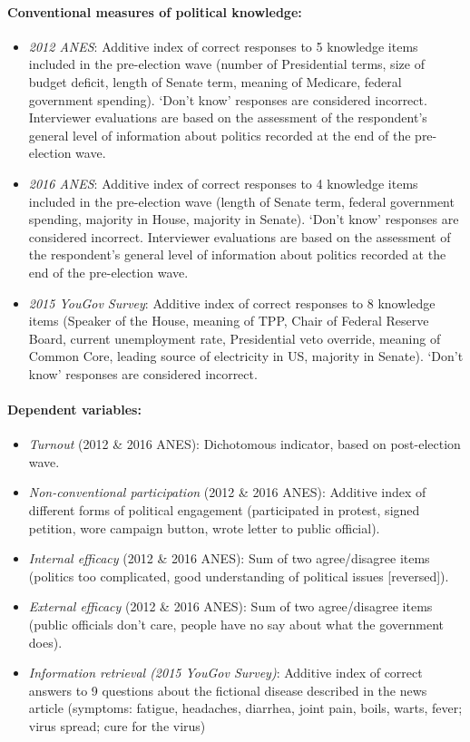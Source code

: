 \paragraph{Conventional measures of political knowledge:}
\begin{itemize}
	\item \textit{2012 ANES}: Additive index of correct responses to 5 knowledge items included in the pre-election wave (number of Presidential terms, size of budget deficit, length of Senate term, meaning of Medicare, federal government spending). `Don't know' responses are considered incorrect. Interviewer evaluations are based on the assessment of the respondent's general level of information about politics recorded at the end of the pre-election wave.
	\item \textit{2016 ANES}: Additive index of correct responses to 4 knowledge items included in the pre-election wave (length of Senate term, federal government spending, majority in House, majority in Senate). `Don't know' responses are considered incorrect. Interviewer evaluations are based on the assessment of the respondent's general level of information about politics recorded at the end of the pre-election wave.
	\item \textit{2015 YouGov Survey}: Additive index of correct responses to 8 knowledge items (Speaker of the House, meaning of TPP, Chair of Federal Reserve Board, current unemployment rate, Presidential veto override, meaning of Common Core, leading source of electricity in US, majority in Senate). `Don't know' responses are considered incorrect.
\end{itemize}

\paragraph{Dependent variables:}
\begin{itemize}
	\item \textit{Turnout} (2012 \& 2016 ANES): Dichotomous indicator, based on post-election wave.
	\item \textit{Non-conventional participation} (2012 \& 2016 ANES): Additive index of different forms of political engagement (participated in protest, signed petition, wore campaign button, wrote letter to public official).
	\item \textit{Internal efficacy} (2012 \& 2016 ANES): Sum of two agree/disagree items (politics too complicated, good understanding of political issues [reversed]).
	\item \textit{External efficacy} (2012 \& 2016 ANES): Sum of two agree/disagree items (public officials don't care, people have no say about what the government does).
	\item \textit{Information retrieval (2015 YouGov Survey)}: Additive index of correct answers to 9 questions about the fictional disease described in the news article (symptoms: fatigue, headaches, diarrhea, joint pain, boils, warts, fever; virus spread; cure for the virus)
\end{itemize}

